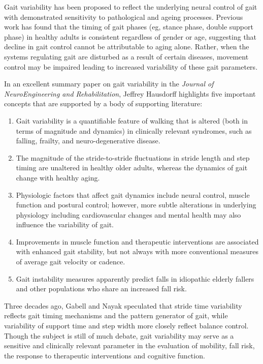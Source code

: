 \documentclass[11pt, oneside]{report}   	%
\begin{document}
Gait variability has been proposed to reflect the underlying neural control of gait with demonstrated sensitivity to pathological and ageing processes\cite{Hausdorff2007}. Previous work has found that the timing of gait phases (eg, stance phase, double support phase) in healthy adults is consistent regardless of gender or age\cite{Jansen1982}, suggesting that decline in gait control cannot be attributable to aging alone. Rather, when the systems regulating gait are disturbed as a result of certain diseases, movement control may be impaired leading to increased variability of these gait parameters\cite{Hausdorff2005}.

In an excellent summary paper on gait variability in the \textit{Journal of NeuroEngineering and Rehabilitation}, Jeffrey Hausdorff highlights five important concepts that are supported by a body of supporting literature\cite{Hausdorff2005}:

\begin{enumerate}
  \item Gait variability is a quantifiable feature of walking that is altered (both in terms of magnitude and dynamics) in clinically relevant syndromes, such as falling, frailty, and neuro-degenerative disease.
  \item The magnitude of the stride-to-stride fluctuations in stride length and step timing are unaltered in healthy older adults, whereas the dynamics of gait change with healthy aging.
  \item Physiologic factors that affect gait dynamics include neural control, muscle function and postural control; however, more subtle alterations in underlying physiology including cardiovascular changes and mental health may also influence the variability of gait.
  \item Improvements in muscle function and therapeutic interventions are associated with enhanced gait stability, but not always with more conventional measures of average gait velocity or cadence.
  \item Gait instability measures apparently predict falls in idiopathic elderly fallers and other populations who share an increased fall risk.
\end{enumerate}

Three decades ago, Gabell and Nayak speculated that stride time variability reflects gait timing mechanisms and the pattern generator of gait, while variability of support time and step width more closely reflect balance control\cite{Gabell1984}. Though the subject is still of much debate, gait variability may serve as a sensitive and clinically relevant parameter in the evaluation of mobility, fall risk, the response to therapeutic interventions and cognitive function\cite{Hausdorff2005}.
\end{document}
